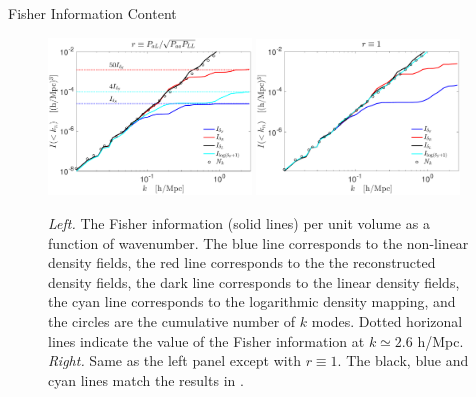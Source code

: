 \begin{section}{Fisher Information Content}

  \begin{figure}
    \includegraphics[width=0.48\textwidth]{fig4a.pdf}
    \includegraphics[width=0.48\textwidth]{fig4b.pdf}
    \centering
    \caption{{\it Left.} The Fisher information (solid lines) per unit volume as
      a function of wavenumber.  The blue line corresponds to the
      non-linear density fields, the red line corresponds
      to the the reconstructed density fields, the dark line
      corresponds to the linear density fields, the cyan line
      corresponds to the logarithmic density mapping, and the circles
      are the cumulative number of $k$ modes.  Dotted horizonal lines indicate the value of the 
      Fisher information at $k \simeq 2.6$ h/Mpc.  {\it Right.} Same
      as the left panel except with $r\equiv 1$. The black, blue and cyan lines
      match the results in \cite{bib:Rimes2006,bib:Mark2009}.}
  \label{fig:fisherinfo}
\end{figure}
\end{section}
